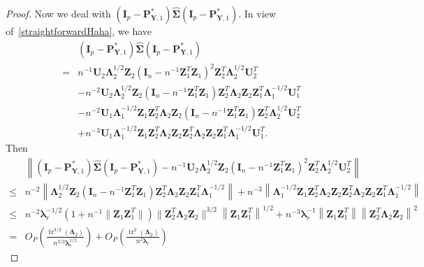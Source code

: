 \documentclass[12pt]{article} %
\DeclareMathOperator{\mytr}{tr}
\newcommand{\bZ}{\mathbf{Z}}
\newcommand{\bP}{\mathbf{P}}
\newcommand{\bY}{\mathbf{Y}}
\newcommand{\bI}{\mathbf{I}}
\newcommand{\bU}{\mathbf{U}}
\newcommand{\bfsym}[1]{\ensuremath{\boldsymbol{#1}}}
\def\blambda {\bfsym {\lambda}}
\def\bLambda {\bfsym {\Lambda}}
\def\bSigma {\bfsym {\Sigma}}
\theoremstyle{definition}
\begin{document}
\begin{appendices}
\begin{proof}
    Now we deal with $(\bI_p-\bP^*_{\bY,1})\hat{\bSigma}(\bI_p-\bP^*_{\bY,1})$.
    In view of~\eqref{straightforwardHaha}, we have
    \begin{equation*}
        \begin{split}
             &(\bI_p-\bP^*_{\bY,1})\hat{\bSigma}(\bI_p-\bP^*_{\bY,1})
             \\
             =&
             n^{-1}\bU_2 \bLambda_2^{1/2} \bZ_2 (\bI_n -n^{-1} \bZ_1^T \bZ_1)^{2} \bZ_2^T \bLambda_2^{1/2} \bU_2^T
             \\
             &-
             n^{-2} \bU_2 \bLambda_2^{1/2} \bZ_2 (\bI_n -n^{-1} \bZ_1^T \bZ_1)
             \bZ_2^T \bLambda_2 \bZ_2 \bZ_1^T \bLambda_1^{-1/2} \bU_1^T
             \\
             &-
             n^{-2} \bU_1 \bLambda_1^{-1/2} \bZ_1 \bZ_2^T \bLambda_2 \bZ_2(\bI_n -n^{-1} \bZ_1^T \bZ_1) \bZ_2^T \bLambda_2^{1/2} \bU_2^T
             \\
             &+
             n^{-3}
\bU_1 \bLambda_1^{-1/2} \bZ_1 \bZ_2^T \bLambda_2 \bZ_2 \bZ_2^T \bLambda_2 \bZ_2 \bZ_1^T \bLambda_1^{-1/2} \bU_1^T
.
        \end{split}
    \end{equation*}
    Then
    \begin{equation*}
        \begin{split}
             &\left\|
             (\bI_p-\bP^*_{\bY,1})\hat{\bSigma}(\bI_p-\bP^*_{\bY,1})
             -n^{-1}\bU_2 \bLambda_2^{1/2} \bZ_2 (\bI_n -n^{-1} \bZ_1^T \bZ_1)^{2} \bZ_2^T \bLambda_2^{1/2} \bU_2^T
             \right\|
             \\
             \leq&
             n^{-2} 
             \left\| \bLambda_2^{1/2} \bZ_2 (\bI_n -n^{-1} \bZ_1^T \bZ_1)
             \bZ_2^T \bLambda_2 \bZ_2 \bZ_1^T \bLambda_1^{-1/2} \right\|
             +
             n^{-3}
\left\| \bLambda_1^{-1/2} \bZ_1 \bZ_2^T \bLambda_2 \bZ_2 \bZ_2^T \bLambda_2 \bZ_2 \bZ_1^T \bLambda_1^{-1/2} \right\|
\\
\leq&
             n^{-2} 
             \blambda_r^{-1/2}
             \left(1 + n^{-1}\|  \bZ_1\bZ_1^T\|\right)
            \|\bZ_2^T \bLambda_2\bZ_2\|^{3/2}
            \left\| \bZ_1\bZ_1^T \right\|^{1/2}
             +
             n^{-3}
             \blambda_r^{-1}
            \left\| \bZ_1 \bZ_1^T \right\|
            \left\|\bZ_2^T \bLambda_2 \bZ_2\right\|^2
\\
=&O_P\left(\frac{\mytr^{3/2}(\bLambda_2)}{n^{3/2}\blambda_r^{1/2}}\right)
+
O_P\left(\frac{\mytr^2(\bLambda_2)}{n^2\blambda_r}\right)

\end{split}
\end{equation*}
\end{proof}
\end{appendices}
\end{document}
